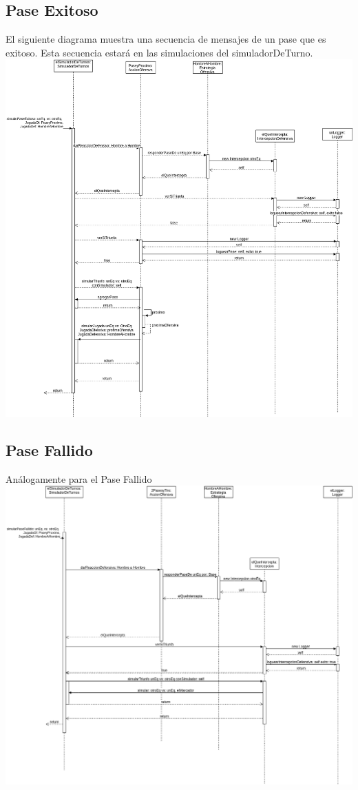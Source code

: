 \subsection{Pase Exitoso}
El siguiente diagrama muestra una secuencia de mensajes de un pase que es exitoso. Esta secuencia estará en las simulaciones del simuladorDeTurno.
\includegraphics[width=\textwidth]{imgs/PaseExitoso.png}
\subsection{Pase Fallido}
Análogamente para el Pase Fallido
\includegraphics[width=\textwidth]{imgs/PaseFallido.png}

